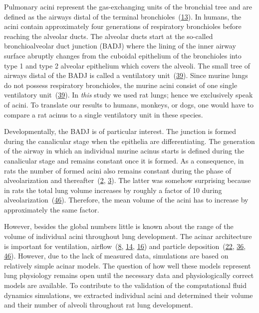\documentclass[
  american,
]{article}
\begin{document}
Pulmonary acini represent the gas-exchanging units of the bronchial tree and are defined as the airways distal of the terminal bronchioles~(\protect\hyperlink{ref-BbEFwEVD}{13}).
In humans, the acini contain approximately four generations of respiratory bronchioles before reaching the alveolar ducts.
The alveolar ducts start at the so-called bronchioalveolar duct junction (BADJ) where the lining of the inner airway surface abruptly changes from the cuboidal epithelium of the bronchioles into type 1 and type 2 alveolar epithelium which covers the alveoli.
The small tree of airways distal of the BADJ is called a ventilatory unit~(\protect\hyperlink{ref-WDrIHn9p}{39}).
Since murine lungs do not possess respiratory bronchioles, the murine acini consist of one single ventilatory unit~(\protect\hyperlink{ref-WDrIHn9p}{39}).
In \emph{this} study we used rat lungs; hence we exclusively speak of acini.
To translate our results to humans, monkeys, or dogs, one would have to compare a rat acinus to a single ventilatory unit in these species.

Developmentally, the BADJ is of particular interest.
The junction is formed during the canalicular stage when the epithelia are differentiating.
The generation of the airway in which an individual murine acinus starts is defined during the canalicular stage and remains constant once it is formed.
As a consequence, in rats the number of formed acini also remains constant during the phase of alveolarization and thereafter~(\protect\hyperlink{ref-14OP85b2F}{2}, \protect\hyperlink{ref-uFNlWogb}{3}).
The latter was somehow surprising because in rats the total lung volume increases by roughly a factor of 10 during alveolarization~(\protect\hyperlink{ref-wnl86DEM}{46}).
Therefore, the mean volume of the acini has to increase by approximately the same factor.

However, besides the global numbers little is known about the range of the volume of individual acini throughout lung development.
The acinar architecture is important for ventilation, airflow~(\protect\hyperlink{ref-CVl41LwO}{8}, \protect\hyperlink{ref-eb0gk6VO}{14}, \protect\hyperlink{ref-1DP2FRUSZ}{16}) and particle deposition~(\protect\hyperlink{ref-18DcNLAv6}{22}, \protect\hyperlink{ref-yHHhvOtP}{36}, \protect\hyperlink{ref-wnl86DEM}{46}).
However, due to the lack of measured data, simulations are based on relatively simple acinar models.
The question of how well these models represent lung physiology remains open until the necessary data and physiologically correct models are available.
To contribute to the validation of the computational fluid dynamics simulations, we extracted individual acini and determined their volume and their number of alveoli throughout rat lung development.
\end{document}
